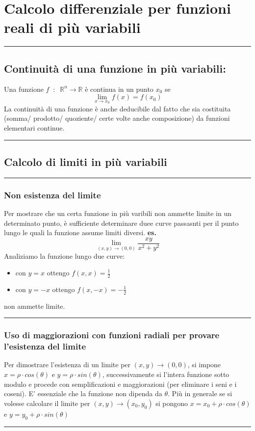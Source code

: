 \section*{Calcolo differenziale per funzioni reali di più variabili}
\rule{\textwidth}{2pt}
\subsection*{Continuità di una funzione in più variabili:}
Una funzione $f \;\;:\;\; \mathbb{R}^n \rightarrow  \mathbb{R}$ è continua in un punto $x_0$ se 
\[
    \lim_{x\rightarrow x_0} f(x) = f(x_0)
\]
La continuità di una funzione è anche deducibile dal fatto che sia costituita (somma/ prodotto/ quoziente/ certe volte anche composizione) da funzioni elementari continue.\newline
\rule{\textwidth}{2pt}
\subsection*{Calcolo di limiti in più variabili}
\rule{\textwidth}{0.4pt}
\subsubsection*{Non esistenza del limite}
Per mostrare che un certa funzione in più varibili non ammette limite in un determinato punto, è sufficiente determinare duee curve passasnti per il punto lungo le quali la funzione assume limiti diversi.
\textbf{es.} 
\[
    \lim_{(x,y)\rightarrow (0,0)} \frac{xy}{x^2+y^2}
\]
Analiziamo la funzione lungo due curve:
\begin{itemize}
    \item con $y=x$ ottengo $f(x,x) = \frac{1}{2}$
    \item con $y=-x$ ottengo $f(x,-x) = - \frac{1}{2}$
\end{itemize}
non ammette limite.\newline
\rule{\textwidth}{0.4pt}
\subsubsection*{Uso di maggiorazioni con funzioni radiali per provare l'esistenza del limite}
Per dimostrare l'esistenza di un limite per $(x,y) \rightarrow (0,0)$, si impone $x=\rho \cdot  cos(\theta)$ e $y= \rho \cdot sin(\theta)$, successivamente si l'intera funzione sotto modulo e procede con semplificazioni e maggiorazioni (per eliminare i seni e i coseni). E' essenziale che la funzione non dipenda da $\theta$.\newline
Più in generale se si volesse calcolare il limite per $(x,y) \rightarrow (x_0, y_0)$ si pongono $x=x_0 +\rho \cdot  cos(\theta)$ e $y= y_0 + \rho \cdot sin(\theta)$ \newline
\rule{\textwidth}{0.4pt}
